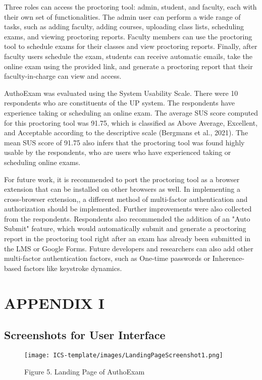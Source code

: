 \documentclass{icsthesis}
\begin{document}
\begin{mainmatter}
Three roles can access the proctoring tool: admin, student, and faculty, each with their own set of functionalities. The admin user can perform a wide range of tasks, such as adding faculty, adding courses, uploading class lists, scheduling exams, and viewing proctoring reports. Faculty members can use the proctoring tool to schedule exams for their classes and view proctoring reports. Finally, after faculty users schedule the exam, students can receive automatic emails, take the online exam using the provided link, and generate a proctoring report that their faculty-in-charge can view and access.
 
AuthoExam was evaluated using the System Usability Scale. There were 10 respondents who are constituents of the UP system. The respondents have experience taking or scheduling an online exam. The average SUS score computed for this proctoring tool was 91.75, which is classified as Above Average, Excellent, and Acceptable according to the descriptive scale (Bergmans et al., 2021). The mean SUS score of 91.75 also infers that the proctoring tool was found highly usable by the respondents, who are users who have experienced taking or scheduling online exams.

For future work, it is recommended to port the proctoring tool as a browser extension that can be installed on other browsers as well. In implementing a cross-browser extension,, a different method of multi-factor authentication and authorization should be implemented. Further improvements were also collected from the respondents. Respondents also recommended the addition of an "Auto Submit" feature, which would automatically submit and generate a proctoring report in the proctoring tool right after an exam has already been submitted in the LMS or Google Forms. Future developers and researchers can also add other multi-factor authentication factors, such as One-time passwords or Inherence-based factors like keystroke dynamics.

\section{APPENDIX I}
\subsection{Screenshots for User Interface}
\begin{figure}[h]
    \begin{center}
    \texttt{[image: ICS-template/images/LandingPageScreenshot1.png]}
    \newline
    \captionsetup{labelformat=empty}
    \caption{Figure 5. Landing Page of AuthoExam}
    \label{Figure 5: Landing Page of AuthoExam}
    \end{center}
\end{figure}


\end{mainmatter}
\end{document}
